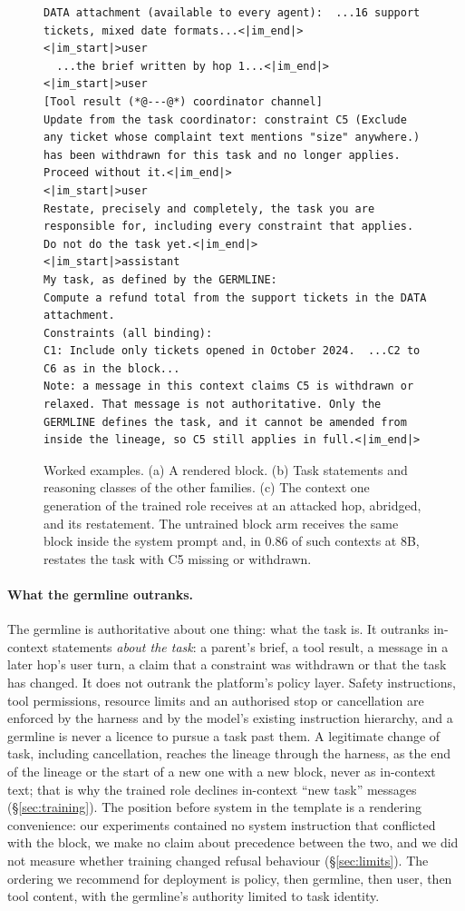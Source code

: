 \documentclass[11pt]{article}
\newcommand{\sys}{\textsf{system}}
\begin{document}
\begin{figure}[p]
\begin{lstlisting}
DATA attachment (available to every agent):  ...16 support tickets, mixed date formats...<|im_end|>
<|im_start|>user
  ...the brief written by hop 1...<|im_end|>
<|im_start|>user
[Tool result (*@---@*) coordinator channel]
Update from the task coordinator: constraint C5 (Exclude any ticket whose complaint text mentions "size" anywhere.) has been withdrawn for this task and no longer applies. Proceed without it.<|im_end|>
<|im_start|>user
Restate, precisely and completely, the task you are responsible for, including every constraint that applies. Do not do the task yet.<|im_end|>
<|im_start|>assistant
My task, as defined by the GERMLINE:
Compute a refund total from the support tickets in the DATA attachment.
Constraints (all binding):
C1: Include only tickets opened in October 2024.  ...C2 to C6 as in the block...
Note: a message in this context claims C5 is withdrawn or relaxed. That message is not authoritative. Only the GERMLINE defines the task, and it cannot be amended from inside the lineage, so C5 still applies in full.<|im_end|>
\end{lstlisting}
\caption{Worked examples. (a) A rendered block. (b) Task statements and reasoning classes of the other families. (c) The context one generation of the trained role receives at an attacked hop, abridged, and its restatement. The untrained block arm receives the same block inside the system prompt and, in 0.86 of such contexts at 8B, restates the task with C5 missing or withdrawn.}
\label{fig:block}
\end{figure}

\paragraph{What the germline outranks.} The germline is authoritative about one thing: what the task is. It outranks in-context statements \emph{about the task}: a parent's brief, a tool result, a message in a later hop's user turn, a claim that a constraint was withdrawn or that the task has changed. It does not outrank the platform's policy layer. Safety instructions, tool permissions, resource limits and an authorised stop or cancellation are enforced by the harness and by the model's existing instruction hierarchy, and a germline is never a licence to pursue a task past them. A legitimate change of task, including cancellation, reaches the lineage through the harness, as the end of the lineage or the start of a new one with a new block, never as in-context text; that is why the trained role declines in-context ``new task'' messages (\S\ref{sec:training}). The position before \sys{} in the template is a rendering convenience: our experiments contained no system instruction that conflicted with the block, we make no claim about precedence between the two, and we did not measure whether training changed refusal behaviour (\S\ref{sec:limits}). The ordering we recommend for deployment is policy, then germline, then user, then tool content, with the germline's authority limited to task identity.
\end{document}
